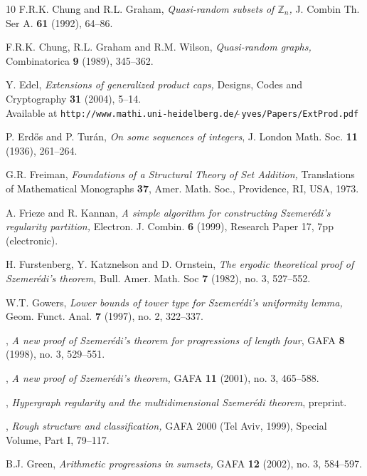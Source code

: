 \documentclass[12pt,a4paper,reqno]{amsart}
\numberwithin{equation}{section}
\theoremstyle{plain}
\theoremstyle{definition}
\begin{document}
\begin{thebibliography}{10}
 F.R.K. Chung and R.L. Graham, \emph{Quasi-random subsets of $\mathbb{Z}_n$,} J. Combin Th. Ser A. \textbf{61} (1992), 64--86.

 F.R.K. Chung, R.L. Graham and R.M. Wilson, \emph{Quasi-random graphs,} Combinatorica \textbf{9} (1989), 345--362.

 Y. Edel, \emph{Extensions of generalized product caps,} Designs, Codes and Cryptography \textbf{31} (2004), 5--14.\\
Available at \texttt{http://www.mathi.uni-heidelberg.de/$\widetilde{\;}$yves/Papers/ExtProd.pdf}

 P. Erd\H{o}s and P. Tur\'an, \emph{On some sequences of integers}, J. London Math. Soc. \textbf{11} (1936), 261--264.


 G.R. Freiman, \emph{Foundations of a Structural Theory of Set Addition,} Translations of Mathematical Monographs \textbf{37}, Amer. Math. Soc., Providence, RI, USA, 1973.

 A. Frieze and R. Kannan, \emph{A simple algorithm for constructing Szemer\'edi's regularity partition,} Electron. J. Combin. \textbf{6} (1999), Research Paper 17, 7pp (electronic).

 H. Furstenberg, Y. Katznelson and D. Ornstein, \emph{The ergodic theoretical proof of Szemer\'edi's theorem,} Bull. Amer. Math. Soc \textbf{7} (1982), no. 3, 527--552.

 W.T. Gowers, 
\emph{Lower bounds of tower type for Szemer\'edi's uniformity lemma,}
Geom. Funct. Anal. \textbf{7} (1997), no. 2, 322--337.

 \bysame,  \emph{A new proof of Szemer\'edi's theorem for progressions of length four}, GAFA \textbf{8} (1998), no. 3, 529--551.

 \bysame, \emph{A new proof of Szemer\'edi's theorem,} GAFA \textbf{11} (2001), no. 3, 465--588.

 \bysame,  \emph{Hypergraph regularity and the multidimensional Szemer\'edi theorem}, preprint.

 \bysame, \emph{Rough structure and classification,} GAFA 2000 (Tel Aviv, 1999), Special Volume, Part I, 79--117.

 B.J. Green, \emph{Arithmetic progressions in sumsets,} GAFA \textbf{12} (2002), no. 3, 584--597.


\end{thebibliography}
\end{document}
